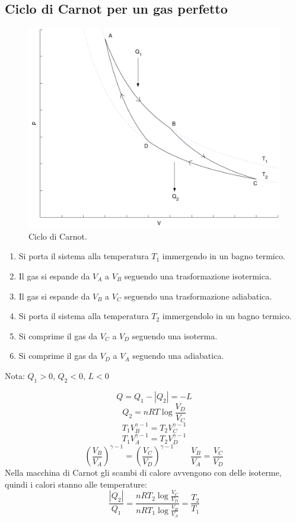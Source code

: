 \subsection{Ciclo di Carnot per un gas perfetto}
\begin{figure}[htbp]
   \centering
   \includegraphics[scale=0.5]{immagini/fisica1/Carnot}
   \caption{Ciclo di Carnot.}
\end{figure}
\parbox[]{\textwidth}{
   \begin{enumerate}
      \item Si porta il sistema alla temperatura $T_1$ immergendo in un bagno termico.
      \item Il gas si espande da $V_A$ a $V_B$ seguendo una trasformazione isotermica.
      \item Il gas si espande da $V_B$ a $V_C$ seguendo una trasformazione adiabatica.
      \item Si porta il sistema alla temperatura $T_2$ immergendolo in un bagno termico.
      \item Si comprime il gas da $V_C$ a $V_D$ seguendo una isoterma.
      \item Si comprime il gas da $V_D$ a $V_A$ seguendo una adiabatica.
   \end{enumerate}}
Nota: $Q_1>0$, $Q_2<0$, $L<0$

\[Q=Q_1-|Q_2|=-L\]
\[Q_2=nRT\log\frac{V_D}{V_C}\]
\[T_1V_B^{\gamma-1}=T_2V_C^{\gamma-1}\]
\[T_1V_A^{\gamma-1}=T_2V_D^{\gamma-1}\]
\[\left(\frac{V_B}{V_A}\right)^{\gamma-1}=\left(\frac{V_C}{V_D}\right)^{\gamma-1}\qquad \frac{V_B}{V_A}=\frac{V_C}{V_D}\]
Nella macchina di Carnot gli scambi di calore avvengono con delle isoterme, quindi i calori stanno alle temperature:
\begin{equation}
   \frac{|Q_2|}{Q_1}=\frac{nRT_2\log\frac{V_C}{V_D}}{nRT_1\log\frac{V_B}{V_A}}=\frac{T_2}{T_1}
\end{equation}

